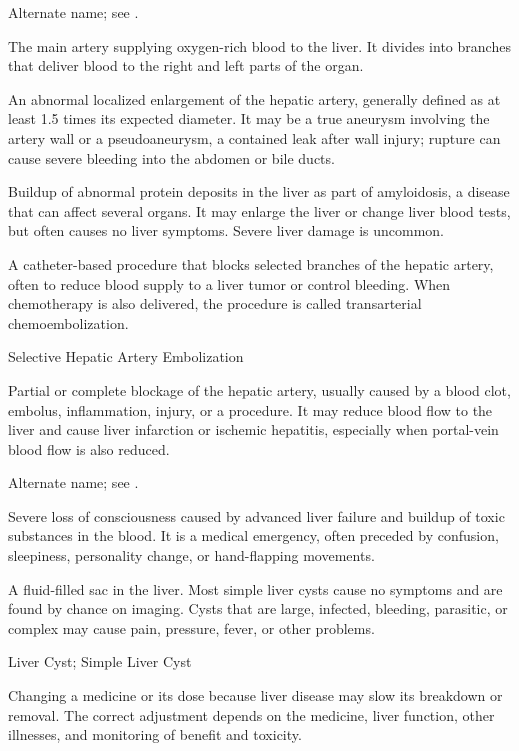  Alternate name; see .

 The main artery supplying oxygen-rich blood to the liver. It divides into branches that deliver blood to the right and left parts of the organ.

 An abnormal localized enlargement of the hepatic artery, generally defined as at least 1.5 times its expected diameter. It may be a true aneurysm involving the artery wall or a pseudoaneurysm, a contained leak after wall injury; rupture can cause severe bleeding into the abdomen or bile ducts.

 Buildup of abnormal protein deposits in the liver as part
of amyloidosis, a disease that can affect several organs. It may enlarge the liver or
change liver blood tests, but often causes no liver symptoms. Severe liver damage is
uncommon.

 A catheter-based procedure that blocks selected branches of the hepatic artery, often to reduce blood supply to a liver tumor or control bleeding. When chemotherapy is also delivered, the procedure is called transarterial chemoembolization.

\synonyms
Selective Hepatic Artery Embolization

 Partial or complete blockage of the hepatic artery, usually caused by a blood clot, embolus, inflammation, injury, or a procedure. It may reduce blood flow to the liver and cause liver infarction or ischemic hepatitis, especially when portal-vein blood flow is also reduced.

 Alternate name; see .

 Severe loss of consciousness caused by advanced liver failure and buildup of toxic substances in the blood. It is a medical emergency, often preceded by confusion, sleepiness, personality change, or hand-flapping movements.

 A fluid-filled sac in the liver. Most simple liver cysts cause no symptoms and are found by chance on imaging. Cysts that are large, infected, bleeding, parasitic, or complex may cause pain, pressure, fever, or other problems.

\synonyms
Liver Cyst; Simple Liver Cyst

 Changing a medicine or its dose because liver disease may slow its breakdown or removal. The correct adjustment depends on the medicine, liver function, other illnesses, and monitoring of benefit and toxicity.

